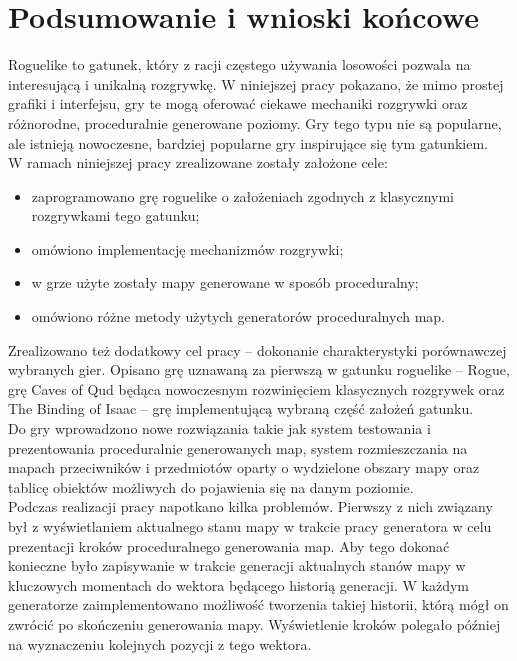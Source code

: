 \documentclass[12pt,twoside]{article}
\begin{document}
\clearpage

\section*{Podsumowanie i wnioski końcowe}

Roguelike to gatunek, który z racji częstego używania losowości pozwala na interesującą i unikalną rozgrywkę. W niniejszej pracy pokazano, że mimo prostej grafiki i interfejsu, gry te mogą oferować ciekawe mechaniki rozgrywki oraz różnorodne, proceduralnie generowane poziomy. Gry tego typu nie są popularne, ale istnieją nowoczesne, bardziej popularne gry inspirujące się tym gatunkiem. \\ 


W ramach niniejszej pracy zrealizowane zostały założone cele: 
\begin{itemize}
	\item zaprogramowano grę roguelike o założeniach zgodnych z klasycznymi rozgrywkami tego gatunku;
	\item omówiono implementację mechanizmów rozgrywki;
	\item w grze użyte zostały mapy generowane w sposób proceduralny;
	\item omówiono różne metody użytych generatorów proceduralnych map.
\end{itemize}

Zrealizowano też dodatkowy cel pracy -- dokonanie charakterystyki porównawczej wybranych gier. Opisano grę uznawaną za pierwszą w gatunku roguelike -- Rogue, grę Caves of Qud będąca nowoczesnym rozwinięciem klasycznych rozgrywek oraz The Binding of Isaac -- grę implementującą wybraną część założeń gatunku. \\

Do gry wprowadzono nowe rozwiązania takie jak system testowania i prezentowania proceduralnie generowanych map, system rozmieszczania na mapach przeciwników i przedmiotów oparty o wydzielone obszary mapy oraz tablicę obiektów możliwych do pojawienia się na danym poziomie.
\\

Podczas realizacji pracy napotkano kilka problemów. Pierwszy z nich związany był z wyświetlaniem aktualnego stanu mapy w trakcie pracy generatora w celu prezentacji kroków proceduralnego generowania map. Aby tego dokonać konieczne było zapisywanie w trakcie generacji aktualnych stanów mapy w kluczowych momentach do wektora będącego historią generacji. W każdym generatorze zaimplementowano możliwość tworzenia takiej historii, którą mógł on zwrócić po skończeniu generowania mapy. Wyświetlenie kroków polegało później na wyznaczeniu kolejnych pozycji z tego wektora.
\end{document}
